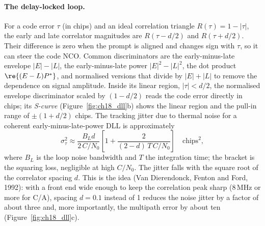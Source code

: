 \paragraph{The delay-locked loop.} For a code error $\tau$ (in chips) and an ideal correlation
triangle $R(\tau)=1-|\tau|$, the early and late correlator magnitudes are $R(\tau-d/2)$ and
$R(\tau+d/2)$. Their difference is zero when the prompt is aligned and changes sign with
$\tau$, so it can steer the code NCO. Common  discriminators are the
early-minus-late envelope $|E|-|L|$, the early-minus-late power $|E|^2-|L|^2$, the
dot product $\re\{(E-L)P^*\}$, and normalised versions that divide by $|E|+|L|$ to remove the
dependence on signal amplitude. Inside its linear region, $|\tau|<d/2$, the normalised
envelope discriminator scaled by $(1-d/2)$ reads the code error directly in chips; its
\emph{S-curve} (Figure~\ref{fig:ch18_dll}b) shows the linear region and the pull-in range of
$\pm(1+d/2)$ chips. The tracking jitter due to thermal noise for a coherent
early-minus-late-power DLL is approximately
\begin{equation}
\sigma_\tau^2\approx\frac{B_Ld}{2\,C/N_0}\left[1+\frac{2}{(2-d)\,T\,C/N_0}\right]\quad\text{chips}^2,
\label{eq:ch18:dlljitter}
\end{equation}
where $B_L$ is the loop noise bandwidth and $T$ the integration time; the bracket is the
squaring loss, negligible at high $C/N_0$. The jitter falls with the square root of the
correlator spacing $d$. This is the  idea (Van Dierendonck, Fenton and
Ford, 1992): with a front end wide enough to keep the correlation peak sharp (8\,MHz or more
for C/A), spacing $d=0.1$ instead of 1 reduces the noise jitter by a factor of about three and,
more importantly, the multipath error by about ten (Figure~\ref{fig:ch18_dll}c).


